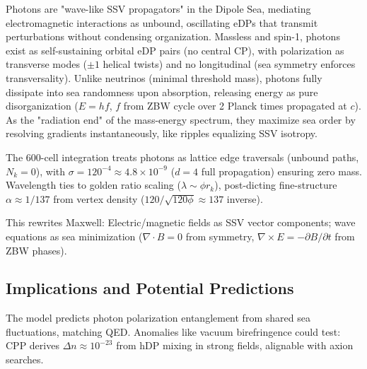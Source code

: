 \documentclass{article}
\begin{document}
Photons are "wave-like SSV propagators" in the Dipole Sea, mediating electromagnetic interactions as unbound, oscillating eDPs that transmit perturbations without condensing organization. Massless and spin-1, photons exist as self-sustaining orbital eDP pairs (no central CP), with polarization as transverse modes ($\pm1$ helical twists) and no longitudinal (sea symmetry enforces transversality). Unlike neutrinos (minimal threshold mass), photons fully dissipate into sea randomness upon absorption, releasing energy as pure disorganization ($E = h f$, $f$ from ZBW cycle over 2 Planck times propagated at $c$). As the "radiation end" of the mass-energy spectrum, they maximize sea order by resolving gradients instantaneously, like ripples equalizing SSV isotropy.

The 600-cell integration treats photons as lattice edge traversals (unbound paths, $N_k=0$), with $\sigma=120^{-4} \approx 4.8 \times 10^{-9}$ ($d=4$ full propagation) ensuring zero mass. Wavelength ties to golden ratio scaling ($\lambda \sim \phi r_k$), post-dicting fine-structure $\alpha \approx 1/137$ from vertex density ($120/\sqrt{120 \phi} \approx 137$ inverse).

This rewrites Maxwell: Electric/magnetic fields as SSV vector components; wave equations as sea minimization ($\nabla\cdot B=0$ from symmetry, $\nabla\times E = -\partial B/\partial t$ from ZBW phases).

\subsection{Implications and Potential Predictions}

The model predicts photon polarization entanglement from shared sea fluctuations, matching QED. Anomalies like vacuum birefringence could test: CPP derives $\Delta n \approx 10^{-23}$ from hDP mixing in strong fields, alignable with axion searches.
\end{document}
